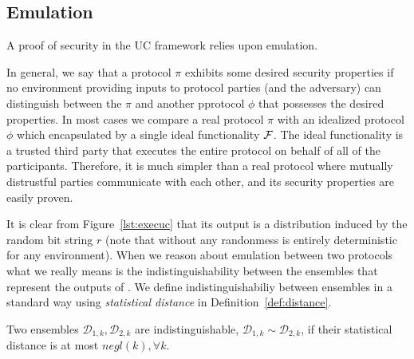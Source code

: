 

\subsection{Emulation}
A proof of security in the UC framework relies upon emulation.

In general, we say that a protocol $\pi$ exhibits some desired security properties if no environment providing inputs to protocol parties (and the adversary) can distinguish between the $\pi$ and another pprotocol $\phi$ that possesses the desired properties.
In most cases we compare a real protocol $\pi$ with an idealized protocol $\phi$ which encapsulated by a single ideal functionality $\mathcal{F}$.
The ideal functionality is a trusted third party that executes the entire protocol on behalf of all of the participants.
Therefore, it is much simpler than a real protocol where mutually distrustful parties communicate with each other, and its security properties are easily proven.

It is clear from Figure~\ref{lst:execuc} that its output is a distribution induced by the random bit string $r$ (note that without any randonmess  is entirely deterministic for any environment).
When we reason about emulation between two protocols what we really means is the indistinguishability between the ensembles that represent the outputs of .
We define indistinguishabiliy between ensembles in a standard way using \textit{statistical distance} in Definition~\ref{def:distance}.

\begin{definition}[Indisinguishability]\label{def:distance}
Two ensembles $\mathcal{D}_{1,k}, \mathcal{D}_{2,k}$ are indistinguishable, $\mathcal{D}_{1,k} \sim \mathcal{D}_{2,k}$, if their statistical distance is at most $negl(k), \forall k$.
\end{definition}


